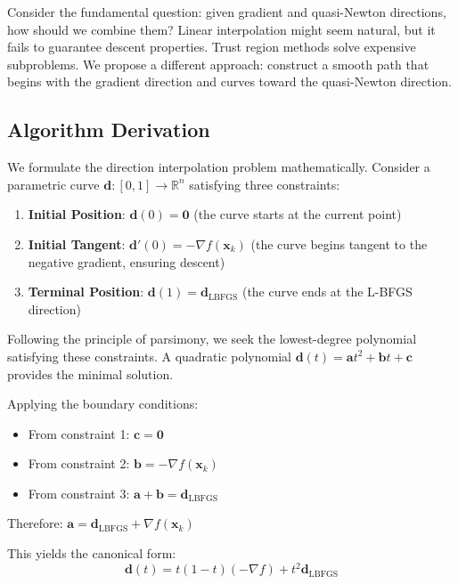 Consider the fundamental question: given gradient and quasi-Newton directions, how should we combine them?
Linear interpolation might seem natural, but it fails to guarantee descent properties.
Trust region methods solve expensive subproblems.
We propose a different approach: construct a smooth path that begins with the gradient direction and curves toward the quasi-Newton direction.

\hypertarget{algorithm-derivation}{%
\subsection{Algorithm Derivation}\label{algorithm-derivation}}

We formulate the direction interpolation problem mathematically. Consider a parametric curve
\(\mathbf{d}: [0,1] \rightarrow \mathbb{R}^n\) satisfying three constraints:

\begin{enumerate}
\def\labelenumi{\arabic{enumi}.}
\item
  \textbf{Initial Position}: \(\mathbf{d}(0) = \mathbf{0}\) (the curve starts at the current point)
\item
  \textbf{Initial Tangent}: \(\mathbf{d}'(0) = -\nabla f(\mathbf{x}_k)\) (the curve begins tangent to the negative gradient, ensuring descent)
\item
  \textbf{Terminal Position}: \(\mathbf{d}(1) = \mathbf{d}_{\text{LBFGS}}\) (the curve ends at the L-BFGS direction)
\end{enumerate}

Following the principle of parsimony, we seek the lowest-degree polynomial satisfying these constraints.
A quadratic polynomial \(\mathbf{d}(t) = \mathbf{a}t^2 + \mathbf{b}t + \mathbf{c}\) provides the minimal solution.

Applying the boundary conditions:

\begin{itemize}
\tightlist
\item
  From constraint 1: \(\mathbf{c} = \mathbf{0}\)
\item
  From constraint 2: \(\mathbf{b} = -\nabla f(\mathbf{x}_k)\)
\item
  From constraint 3: \(\mathbf{a} + \mathbf{b} = \mathbf{d}_{\text{LBFGS}}\)
\end{itemize}

Therefore: \(\mathbf{a} = \mathbf{d}_{\text{LBFGS}} + \nabla f(\mathbf{x}_k)\)

This yields the canonical form:
\[\mathbf{d}(t) = t(1-t)(-\nabla f) + t^2 \mathbf{d}_{\text{LBFGS}}\]

